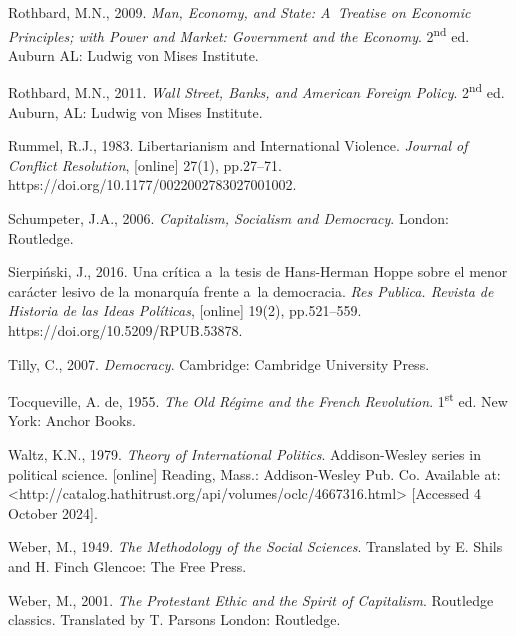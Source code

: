 Rothbard, M.N., 2009. \textit{Man, Economy, and State: A~Treatise on Economic Principles; with Power and Market: Government and the Economy}. 2\textsuperscript{nd} ed. Auburn AL: Ludwig von Mises Institute.



Rothbard, M.N., 2011. \textit{Wall Street, Banks, and American Foreign Policy}. 2\textsuperscript{nd} ed. Auburn, AL: Ludwig von Mises Institute.



Rummel, R.J., 1983. Libertarianism and International Violence. \textit{Journal of Conflict Resolution}, [online] 27(1), pp.27–71. https://doi.org/10.1177/0022002783027001002.



Schumpeter, J.A., 2006. \textit{Capitalism, Socialism and Democracy}. London: Routledge.



Sierpiński, J., 2016. Una crítica a~la tesis de Hans-Herman Hoppe sobre el menor carácter lesivo de la monarquía frente a~la democracia. \textit{Res Publica. Revista de Historia de las Ideas Políticas}, [online] 19(2), pp.521–559. https://doi.org/10.5209/RPUB.53878.



Tilly, C., 2007. \textit{Democracy}. Cambridge: Cambridge University Press.



Tocqueville, A. de, 1955. \textit{The Old Régime and the French Revolution}. 1\textsuperscript{st} ed. New York: Anchor Books.



Waltz, K.N., 1979. \textit{Theory of International Politics}. Addison-Wesley series in political science. [online] Reading, Mass.: Addison-Wesley Pub. Co. Available at: {\textless}http://catalog.hathitrust.org/api/volumes/oclc/4667316.html{\textgreater} [Accessed 4 October 2024].



Weber, M., 1949. \textit{The Methodology of the Social Sciences}. Translated by E. Shils and H. Finch Glencoe: The Free Press.



Weber, M., 2001. \textit{The Protestant Ethic and the Spirit of Capitalism}. Routledge classics. Translated by T. Parsons London: Routledge.



